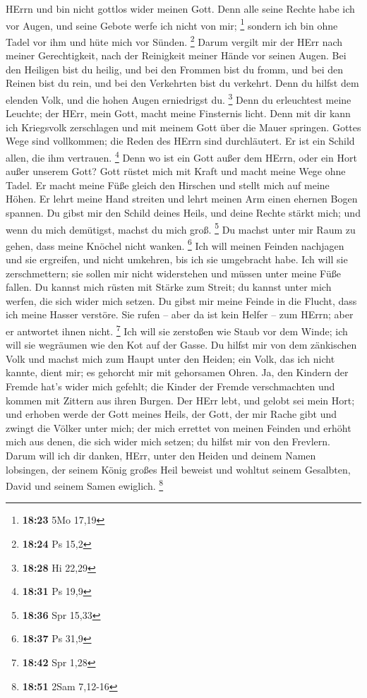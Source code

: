 HErrn und bin nicht gottlos wider meinen Gott.  Denn alle
seine Rechte habe ich vor Augen, und seine Gebote werfe ich nicht von
mir; \footnote{\textbf{18:23} 5Mo 17,19}  sondern ich bin
ohne Tadel vor ihm und hüte mich vor Sünden. \footnote{\textbf{18:24} Ps
  15,2}  Darum vergilt mir der HErr nach meiner
Gerechtigkeit, nach der Reinigkeit meiner Hände vor seinen Augen.
 Bei den Heiligen bist du heilig, und bei den Frommen
bist du fromm,  und bei den Reinen bist du rein, und bei
den Verkehrten bist du verkehrt.  Denn du hilfst dem
elenden Volk, und die hohen Augen erniedrigst du. \footnote{\textbf{18:28}
  Hi 22,29}  Denn du erleuchtest meine Leuchte; der HErr,
mein Gott, macht meine Finsternis licht.  Denn mit dir
kann ich Kriegsvolk zerschlagen und mit meinem Gott über die Mauer
springen.  Gottes Wege sind vollkommen; die Reden des
HErrn sind durchläutert. Er ist ein Schild allen, die ihm vertrauen.
\footnote{\textbf{18:31} Ps 19,9}  Denn wo ist ein Gott
außer dem HErrn, oder ein Hort außer unserem Gott?  Gott
rüstet mich mit Kraft und macht meine Wege ohne Tadel. 
Er macht meine Füße gleich den Hirschen und stellt mich auf meine Höhen.
 Er lehrt meine Hand streiten und lehrt meinen Arm einen
ehernen Bogen spannen.  Du gibst mir den Schild deines
Heils, und deine Rechte stärkt mich; und wenn du mich demütigst, machst
du mich groß. \footnote{\textbf{18:36} Spr 15,33}  Du
machst unter mir Raum zu gehen, dass meine Knöchel nicht wanken.
\footnote{\textbf{18:37} Ps 31,9}  Ich will meinen
Feinden nachjagen und sie ergreifen, und nicht umkehren, bis ich sie
umgebracht habe.  Ich will sie zerschmettern; sie sollen
mir nicht widerstehen und müssen unter meine Füße fallen.
 Du kannst mich rüsten mit Stärke zum Streit; du kannst
unter mich werfen, die sich wider mich setzen.  Du gibst
mir meine Feinde in die Flucht, dass ich meine Hasser verstöre.
 Sie rufen -- aber da ist kein Helfer -- zum HErrn; aber
er antwortet ihnen nicht. \footnote{\textbf{18:42} Spr 1,28}
 Ich will sie zerstoßen wie Staub vor dem Winde; ich will
sie wegräumen wie den Kot auf der Gasse.  Du hilfst mir
von dem zänkischen Volk und machst mich zum Haupt unter den Heiden; ein
Volk, das ich nicht kannte, dient mir;  es gehorcht mir
mit gehorsamen Ohren. Ja, den Kindern der Fremde hat's wider mich
gefehlt;  die Kinder der Fremde verschmachten und kommen
mit Zittern aus ihren Burgen.  Der HErr lebt, und gelobt
sei mein Hort; und erhoben werde der Gott meines Heils, 
der Gott, der mir Rache gibt und zwingt die Völker unter mich;
 der mich errettet von meinen Feinden und erhöht mich aus
denen, die sich wider mich setzen; du hilfst mir von den Frevlern.
 Darum will ich dir danken, HErr, unter den Heiden und
deinem Namen lobsingen,  der seinem König großes Heil
beweist und wohltut seinem Gesalbten, David und seinem Samen ewiglich.
\footnote{\textbf{18:51} 2Sam 7,12-16}

